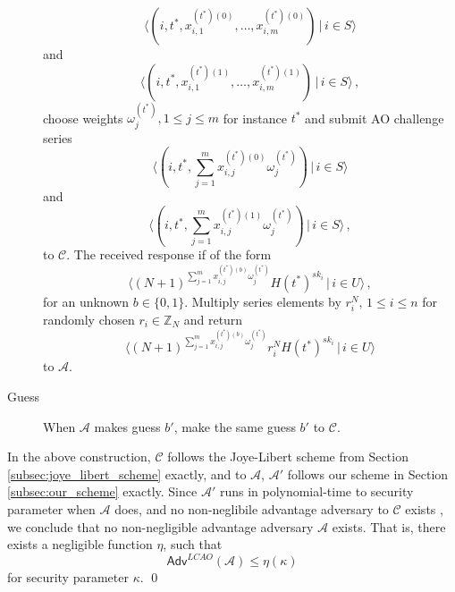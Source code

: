 \documentclass[twocolumn]{autart}
\begin{document}
\begin{pf}
\begin{description}
\begin{equation*}
            \langle(i,t^*,x^{(t^*)(0)}_{i,1},\dots,x^{(t^*)(0)}_{i,m})\,|\,i \in S\rangle
        \end{equation*}
        and
        \begin{equation*}
            \langle(i,t^*,x^{(t^*)(1)}_{i,1},\dots,x^{(t^*)(1)}_{i,m})\,|\, i \in S\rangle\,,
        \end{equation*}
        choose weights $\omega^{(t^*)}_j,1 \leq j \leq m$ for instance $t^*$ and submit AO challenge series
        \begin{equation*}
            \langle(i,t^*,\sum^m_{j=1}x^{(t^*)(0)}_{i,j}\omega^{(t^*)}_j)\,|\,i \in S\rangle
        \end{equation*}
        and
        \begin{equation*}
            \langle(i,t^*,\sum^m_{j=1}x^{(t^*)(1)}_{i,j}\omega^{(t^*)}_j)\,|\,i \in S\rangle\,,
        \end{equation*}
        to $\mathcal{C}$. The received response if of the form 
        \begin{equation*}
            \langle(N+1)^{\sum^m_{j=1}x^{(t^*)(b)}_{i,j}\omega^{(t^*)}_j}H(t^*)^{sk_i}\,|\,i\in U\rangle\,,
        \end{equation*}
        for an unknown $b \in \{0,1\}$. Multiply series elements by $r_i^N,\,1 \leq i \leq n$ for randomly chosen $r_i \in \mathbb{Z}_N$ and return
        \begin{equation*}
            \langle(N+1)^{\sum^m_{j=1}x^{(t^*)(b)}_{i,j}\omega^{(t^*)}_j}r_i^N H(t^*)^{sk_i}\,|\,i\in U\rangle
        \end{equation*}
        to $\mathcal{A}$.
        \item[Guess] When $\mathcal{A}$ makes guess $b'$, make the same guess $b'$ to $\mathcal{C}$.
    \end{description}

    In the above construction, $\mathcal{C}$ follows the Joye-Libert scheme from Section \ref{subsec:joye_libert_scheme} exactly, and to $\mathcal{A}$, $\mathcal{A}'$ follows our scheme in Section \ref{subsec:our_scheme} exactly. Since $\mathcal{A}'$ runs in polynomial-time to security parameter when $\mathcal{A}$ does, and no non-neglibile advantage adversary to $\mathcal{C}$ exists \cite{joyeScalableSchemePrivacyPreserving2013}, we conclude that no non-negligible advantage adversary $\mathcal{A}$ exists. That is, there exists a negligible function $\eta$, such that
    \begin{equation*}
        \mathsf{Adv}^{LCAO}(\mathcal{A}) \leq \eta(\kappa)
    \end{equation*}
    for security parameter $\kappa$. \qed
\end{pf}
\end{document}
